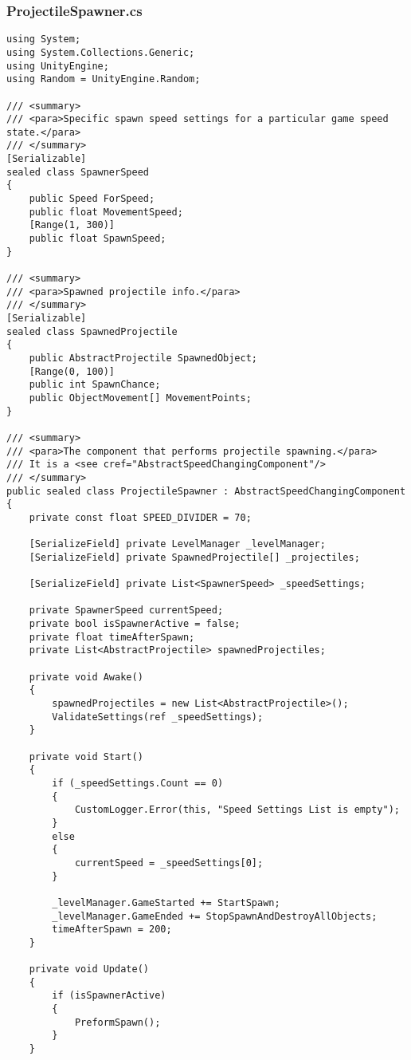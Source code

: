 \subsubsection*{ProjectileSpawner.cs}
\begin{verbatim}
using System;
using System.Collections.Generic;
using UnityEngine;
using Random = UnityEngine.Random;

/// <summary>
/// <para>Specific spawn speed settings for a particular game speed state.</para>
/// </summary>
[Serializable]
sealed class SpawnerSpeed
{
    public Speed ForSpeed;
    public float MovementSpeed;
    [Range(1, 300)] 
    public float SpawnSpeed;
}

/// <summary>
/// <para>Spawned projectile info.</para>
/// </summary>
[Serializable]
sealed class SpawnedProjectile
{
    public AbstractProjectile SpawnedObject;
    [Range(0, 100)] 
    public int SpawnChance;
    public ObjectMovement[] MovementPoints;
}

/// <summary>
/// <para>The component that performs projectile spawning.</para>
/// It is a <see cref="AbstractSpeedChangingComponent"/>
/// </summary>
public sealed class ProjectileSpawner : AbstractSpeedChangingComponent
{
    private const float SPEED_DIVIDER = 70;

    [SerializeField] private LevelManager _levelManager;
    [SerializeField] private SpawnedProjectile[] _projectiles;

    [SerializeField] private List<SpawnerSpeed> _speedSettings;

    private SpawnerSpeed currentSpeed;
    private bool isSpawnerActive = false;
    private float timeAfterSpawn;
    private List<AbstractProjectile> spawnedProjectiles;

    private void Awake()
    {
        spawnedProjectiles = new List<AbstractProjectile>();
        ValidateSettings(ref _speedSettings);
    }

    private void Start()
    {
        if (_speedSettings.Count == 0)
        {
            CustomLogger.Error(this, "Speed Settings List is empty");
        }
        else
        {
            currentSpeed = _speedSettings[0];
        }

        _levelManager.GameStarted += StartSpawn;
        _levelManager.GameEnded += StopSpawnAndDestroyAllObjects;
        timeAfterSpawn = 200;
    }

    private void Update()
    {
        if (isSpawnerActive)
        {
            PreformSpawn();
        }
    }


\end{verbatim}
